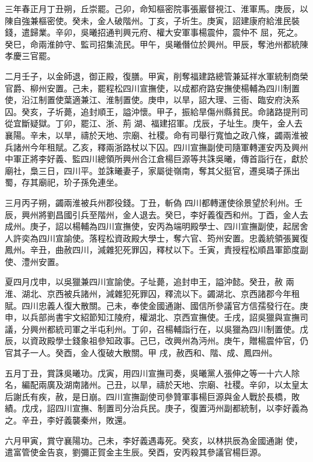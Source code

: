 \begin{pinyinscope}
 三年春正月丁丑朔，丘崇罷。己卯，命知樞密院事張巖督視江、淮軍馬。庚辰，以陳自強兼樞密使。癸未，金人破階州。丁亥，子圻生。庚寅，詔建康府給淮民裝錢，遣歸業。辛卯，吳曦招通判興元府、權大安軍事楊震仲，震仲不
 屈，死之。癸巳，命兩淮帥守、監司招集流民。甲午，吳曦僭位於興州。甲辰，奪池州都統陳孝慶三官罷。



 二月壬子，以金師退，御正殿，復膳。甲寅，削奪福建路總管兼延祥水軍統制商榮官爵、柳州安置。己未，罷程松四川宣撫使，以成都府路安撫使楊輔為四川制置使，沿江制置使葉適兼江、淮制置使。庚申，以旱，詔大理、三衙、臨安府決系囚。癸亥，子圻薨，追封順王，謚沖懷。甲子，振給旱傷州縣貧民。命諸路提刑司從宜斷疑獄。丁卯，罷江、浙、荊
 湖、福建招軍。戊辰，子址生。庚午，金人去襄陽。辛未，以旱，禱於天地、宗廟、社稷。命有司舉行寬恤之政八條，蠲兩淮被兵諸州今年租賦。乙亥，釋兩浙路杖以下囚。四川宣撫副使司隨軍轉運安丙及興州中軍正將李好義、監四川總領所興州合江倉楊巨源等共誅吳曦，傳首詣行在，獻於廟社，梟三日，四川平。並誅曦妻子，家屬徙嶺南，奪其父挺官，遷吳璘子孫出蜀，存其廟祀，玠子孫免連坐。



 三月丙子朔，蠲兩淮被兵州郡役錢。丁丑，斬偽
 四川都轉運使徐景望於利州。壬辰，興州將劉昌國引兵至階州，金人退去。癸巳，李好義復西和州。丁酉，金人去成州。庚子，詔以楊輔為四川宣撫使，安丙為端明殿學士、四川宣撫副使，起居舍人許奕為四川宣諭使。落程松資政殿大學士，奪六官、筠州安置。忠義統領張翼復鳳州。辛丑，曲赦四川，減雜犯死罪囚，釋杖以下。壬寅，責授程松順昌軍節度副使、澧州安置。



 夏四月戊申，以吳獵兼四川宣諭使。子址薨，追封申王，謚沖懿。癸丑，赦
 兩淮、湖北、京西被兵諸州，減雜犯死罪囚，釋流以下。蠲湖北、京西諸郡今年租賦。四川忠義人復大散關。己未，奉使金國通謝、國信所參議官方信孺發行在。庚申，以兵部尚書宇文紹節知江陵府，權湖北、京西宣撫使。壬戌，詔吳獵與宣撫司議，分興州都統司軍之半屯利州。丁卯，召楊輔詣行在，以吳獵為四川制置使。戊辰，以資政殿學士錢象祖參知政事。己巳，改興州為沔州。庚午，贈楊震仲官，仍官其子一人。癸酉，金人復破大散關。甲
 戌，赦西和、階、成、鳳四州。



 五月丁丑，賞誅吳曦功。戊寅，用四川宣撫司奏，吳曦黨人張伸之等一十六人除名，編配兩廣及湖南諸州。己丑，以旱，禱於天地、宗廟、社稷。辛卯，以太皇太后謝氏有疾，赦，是日崩。四川宣撫副使司參贊軍事楊巨源與金人戰於長橋，敗績。戊戌，詔四川宣撫、制置司分治兵民。庚子，復置沔州副都統制，以李好義為之。辛丑，李好義襲秦州，敗還。



 六月甲寅，賞守襄陽功。己未，李好義遇毒死。癸亥，以林拱辰為金國通謝
 使，遣富管使金告哀，劉彌正賀金主生辰。癸酉，安丙殺其參議官楊巨源。




\end{pinyinscope}
